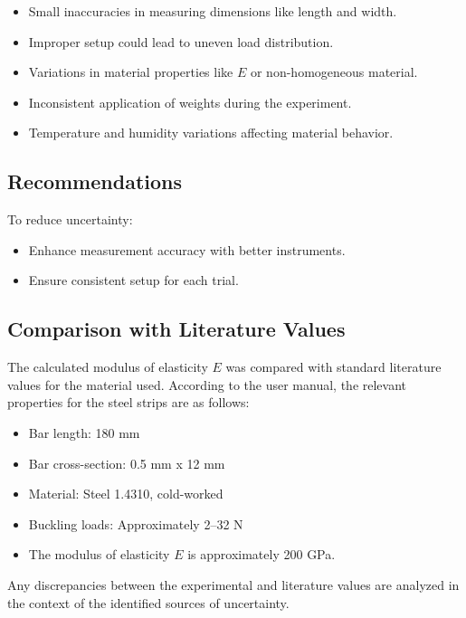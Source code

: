 \documentclass[12pt]{article}
\begin{document}
\begin{itemize}
    \item Small inaccuracies in measuring dimensions like length and width.
    \item Improper setup could lead to uneven load distribution.
    \item Variations in material properties like \( E \) or non-homogeneous material.
    \item Inconsistent application of weights during the experiment.
    \item Temperature and humidity variations affecting material behavior.
\end{itemize}

\subsection{Recommendations}
\label{subsec:recommendations}

To reduce uncertainty:

\begin{itemize}
    \item Enhance measurement accuracy with better instruments.
    \item Ensure consistent setup for each trial.
\end{itemize}


\subsection{Comparison with Literature Values}
\label{subsec:comparison}

The calculated modulus of elasticity \( E \) was compared with standard literature values for the material used. According to the user manual, the relevant properties for the steel strips are as follows:
\begin{itemize}
    \item Bar length: 180 mm
    \item Bar cross-section: 0.5 mm x 12 mm
    \item Material: Steel 1.4310, cold-worked
    \item Buckling loads: Approximately 2–32 N
    \item The modulus of elasticity \( E \) is approximately 200 GPa.
\end{itemize}

Any discrepancies between the experimental and literature values are analyzed in the context of the identified sources of uncertainty.
\end{document}
